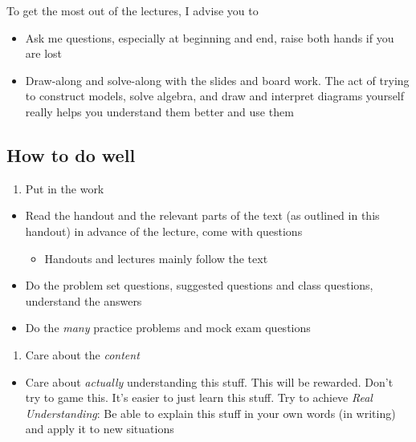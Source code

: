 \documentclass[]{article}
\providecommand{\tightlist}{%
  \setlength{\itemsep}{0pt}\setlength{\parskip}{0pt}}
\begin{document}
\bigskip

To get the most out of the lectures, I advise you to

\begin{itemize}
\item
  Ask me questions, especially at beginning and end, raise both hands if you are lost
\item
  Draw-along and solve-along with the slides and board work. The act of trying to construct models, solve algebra, and draw and interpret diagrams yourself really helps you understand them better and use them
\end{itemize}

\hypertarget{how-to-do-well}{%
\subsection{How to do well}\label{how-to-do-well}}

\begin{enumerate}
\def\labelenumi{\arabic{enumi}.}
\tightlist
\item
  Put in the work
\end{enumerate}

\begin{itemize}
\item
  Read the handout and the relevant parts of the text (as outlined in this handout) in advance of the lecture, come with questions

  \begin{itemize}
  \tightlist
  \item
    Handouts and lectures mainly follow the text
  \end{itemize}
\item
  Do the problem set questions, suggested questions and class questions, understand the answers
\item
  Do the \emph{many} practice problems and mock exam questions
\end{itemize}

\begin{enumerate}
\def\labelenumi{\arabic{enumi}.}
\setcounter{enumi}{1}
\tightlist
\item
  Care about the \emph{content}
\end{enumerate}

\begin{itemize}
\tightlist
\item
  Care about \emph{actually} understanding this stuff. This will be rewarded. Don't try to game this. It's easier to just learn this stuff. Try to achieve \emph{Real Understanding}: Be able to explain this stuff in your own words (in writing) and apply it to new situations
\end{itemize}
\end{document}
